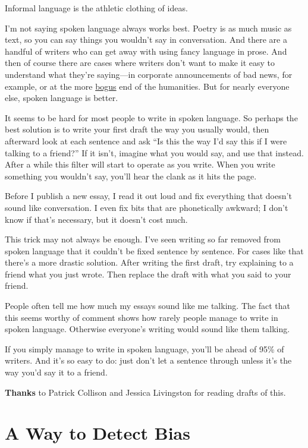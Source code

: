 \documentclass[12pt]{book}
\begin{document}
Informal language is the athletic clothing of ideas.

I'm not saying spoken language always works best. Poetry is as much
music as text, so you can say things you wouldn't say in conversation.
And there are a handful of writers who can get away with using fancy
language in prose. And then of course there are cases where writers
don't want to make it easy to understand what they're saying---in
corporate announcements of bad news, for example, or at the more
\href{https://scholar.google.com/scholar?hl=en&as_sdt=1,5&q=transgression+narrative+postmodern+gender}{bogus}
end of the humanities. But for nearly everyone else, spoken language is
better.

It seems to be hard for most people to write in spoken language. So
perhaps the best solution is to write your first draft the way you
usually would, then afterward look at each sentence and ask ``Is this
the way I'd say this if I were talking to a friend?'' If it isn't,
imagine what you would say, and use that instead. After a while this
filter will start to operate as you write. When you write something you
wouldn't say, you'll hear the clank as it hits the page.

Before I publish a new essay, I read it out loud and fix everything that
doesn't sound like conversation. I even fix bits that are phonetically
awkward; I don't know if that's necessary, but it doesn't cost much.

This trick may not always be enough. I've seen writing so far removed
from spoken language that it couldn't be fixed sentence by sentence. For
cases like that there's a more drastic solution. After writing the first
draft, try explaining to a friend what you just wrote. Then replace the
draft with what you said to your friend.

People often tell me how much my essays sound like me talking. The fact
that this seems worthy of comment shows how rarely people manage to
write in spoken language. Otherwise everyone's writing would sound like
them talking.

If you simply manage to write in spoken language, you'll be ahead of
95\% of writers. And it's so easy to do: just don't let a sentence
through unless it's the way you'd say it to a friend.

\textbf{Thanks} to Patrick Collison and Jessica Livingston for reading
drafts of this.
\chapter{A Way to Detect Bias}
\end{document}
